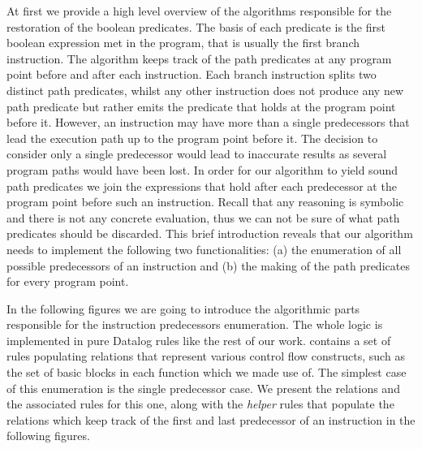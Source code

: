 At first we provide a high level overview of the algorithms responsible
for the restoration of the boolean predicates. The basis of each predicate is
the first boolean expression met in the program, that is usually the first
branch instruction. The algorithm keeps track of the path predicates at any
program point before and after each instruction. Each branch instruction splits
two distinct path predicates, whilst any other instruction does not produce
any new path predicate but rather emits the predicate that holds at the program
point before it. However, an instruction may have more than
a single predecessors that lead the execution path
up to the program point before it. The decision to consider only a single predecessor
would lead to inaccurate results as several program paths would have been lost. In
order for our algorithm to yield sound path predicates we join the
expressions that hold after each predecessor at the program point before such an
instruction. Recall that any reasoning is symbolic and there is not any concrete
evaluation, thus we can not be sure of what path predicates should be discarded.
This brief introduction reveals that our algorithm needs to implement
the following two functionalities: (a) the enumeration of all possible predecessors
of an instruction and (b) the making of the path predicates for every program
point.

In the following figures we are going to introduce the algorithmic parts responsible
for the instruction predecessors enumeration. The whole logic is implemented in
pure Datalog rules like the rest of our work. \doop{} contains a set of rules
populating relations that represent various control flow constructs, such as
the set of basic blocks in each function which we made use of. The simplest case
of this enumeration is the single predecessor case. We present the relations
and the associated rules for this one, along with the \emph{helper} rules that populate the
relations which keep track of the first and last predecessor of an instruction in
the following figures.

